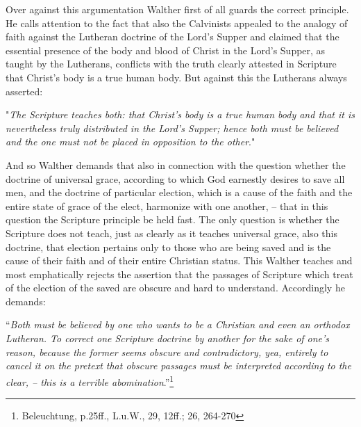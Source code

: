 Over against this argumentation Walther first of all guards the correct principle. He calls attention to the fact that also the Calvinists appealed to the analogy of faith against the Lutheran doctrine of the Lord's Supper and claimed that the essential presence of the body and blood of Christ in the Lord's Supper, as taught by the Lutherans, conflicts with the truth clearly attested in Scripture that Christ's body is a true human body. But against this the Lutherans always asserted: \begin{displayquote}"\textit{The Scripture teaches both: that Christ's body is a true human body and that it is nevertheless truly distributed in the Lord's Supper; hence both must be believed and the one must not be placed in opposition to the other}."\end{displayquote} And so Walther demands that also in connection with the question whether the doctrine of universal grace, according to which God earnestly desires to save all men, and the doctrine of particular election, which is a cause of the faith and the entire state of grace of the elect, harmonize with one another, – that in this question the Scripture principle be held fast. The only question is whether the Scripture does not teach, just as clearly as it teaches universal grace, also this doctrine, that election pertains only to those who are being saved and is the cause of their faith and of their entire Christian status. This Walther teaches and most emphatically rejects the assertion that the passages of Scripture which treat of the election of the saved are obscure and hard to understand. Accordingly he demands: \begin{displayquote}``\textit{Both must be believed by one who wants to be a Christian and even an orthodox Lutheran. To correct one Scripture doctrine by another for the sake of one's reason, because the former seems obscure and contradictory, yea, entirely to cancel it on the pretext that obscure passages must be interpreted according to the clear, – this is a terrible abomination}.''\footnote{Beleuchtung, p.25ff., L.u.W., 29, 12ff.; 26, 264-270}\end{displayquote}

